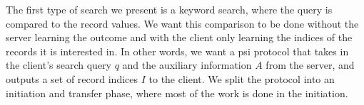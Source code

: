 The first type of search we present is a keyword search, where the query is compared to the record values. We want this comparison to be done without the server learning the outcome and with the client only learning the indices of the records it is interested in. In other words, we want a \acrshort{psi} protocol that takes in the client's search query $ q $ and the auxiliary information $ A $ from the server, and outputs a set of record indices $ I $ to the client. We split the protocol into an initiation and transfer phase, where most of the work is done in the initiation. 